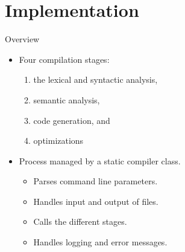 \section{Implementation}
\begin{frame}{Overview}
    \begin{itemize}
        \item Four compilation stages:
        \begin{enumerate}
            \item the lexical and syntactic analysis,
            \item semantic analysis,
            \item code generation, and %
            \item optimizations
        \end{enumerate}
        \item Process managed by a static compiler class.
        \begin{itemize}
            \item Parses command line parameters.
            \item Handles input and output of files.
            \item Calls the different stages.
            \item Handles logging and error messages.
        \end{itemize}
    \end{itemize}    
\end{frame}


